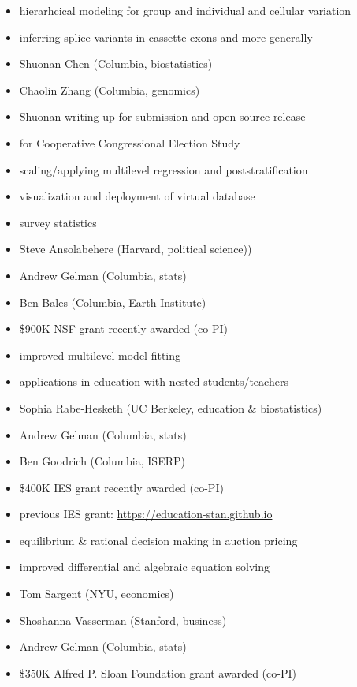 \documentclass[10pt]{report}
\begin{document}
\begin{itemize}
\item hierarhcical modeling for group and individual and cellular variation
\item inferring splice variants in cassette exons and more generally
\item Shuonan Chen (Columbia, biostatistics)
\item Chaolin Zhang (Columbia, genomics)
\vfill
\item \footnotesize{Shuonan writing up for submission and open-source release}
\end{itemize}

\begin{itemize}
\item for Cooperative Congressional Election Study
\item scaling/applying multilevel regression and poststratification
\item visualization and deployment of virtual database
\item survey statistics
\item Steve Ansolabehere (Harvard, political science))
\item Andrew Gelman (Columbia, stats)
\item Ben Bales (Columbia, Earth Institute)
\vfill
\item {\footnotesize \$900K NSF grant recently awarded (co-PI)}
\end{itemize}

\begin{itemize}
\item improved multilevel model fitting
\item applications in education with nested students/teachers
\item Sophia Rabe-Hesketh (UC Berkeley, education \& biostatistics)
\item Andrew Gelman (Columbia, stats)
\item Ben Goodrich (Columbia, ISERP)
\vfill
\item {\footnotesize \$400K IES grant recently awarded (co-PI)}
\item {\footnotesize previous IES grant: \url{https://education-stan.github.io}}
\end{itemize}

\begin{itemize}
\item equilibrium \& rational decision making in auction pricing
\item improved differential and algebraic equation solving
\item Tom Sargent (NYU, economics)
\item Shoshanna Vasserman (Stanford, business)
\item Andrew Gelman (Columbia, stats)
\vfill
\item {\footnotesize \$350K Alfred P. Sloan Foundation grant awarded (co-PI)}
\end{itemize}
\end{document}
